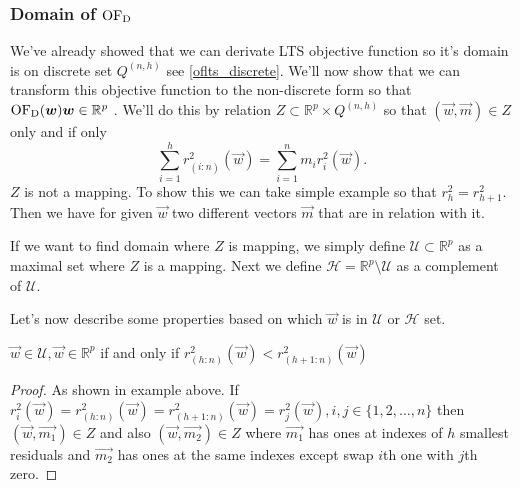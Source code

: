 \subsubsection{Domain of $\operatorname{OF_D}$}
We've already showed that we can derivate LTS objective function so it's domain is on discrete set  $Q^{(n,h)}$ see \ref{oflts_discrete}. We'll now show that we can transform this objective function to the non-discrete form so that $\operatorname{OF_D} (\boldsymbol{w}) \boldsymbol{w} \in \mathbb{R}^p$ \cite{klouda2015exact}.
We'll do this by relation $Z \subset \mathbb{R}^p \times Q^{(n,h)}$ so that $(\vec{w}, \vec{m}) \in Z$ only and if only
\begin{equation}
	\sum\limits_{i=1}^h r^{2}_{(i:n)}(\vec{w})  =  \sum\limits_{i=1}^n m_{i}r^{2}_{i}(\vec{w}).
\end{equation}
$Z$ is not a mapping. To show this we can take simple example so that $r^{2}_{h} = r^{2}_{h+1}$. Then we have for given $\vec{w}$ two different vectors $\vec{m}$ that are in relation with it.

If we want to find domain where $Z$ is mapping, we simply define $\mathcal{U} \subset \mathbb{R}^{p}$ as a maximal set where $Z$ is a mapping. Next we define 
$\mathcal{H} = \mathbb{R}^{p}  \setminus   \mathcal{U}$
as a complement of $\mathcal{U}$.

Let's now describe some properties based on which $\vec{w}$ is in $\mathcal{U}$ or $\mathcal{H}$ set.

\begin{theorem} \label{klouda1}
	$\vec{w} \in \mathcal{U}, \vec{w} \in \mathbb{R}^{p}$ if and only if 
	$r^{2}_{(h:n)}(\vec{w}) < r^{2}_{(h+1:n)}(\vec{w})$
\end{theorem}
\begin{proof}
	As shown in example above. If $r^{2}_{i}(\vec{w}) = r^{2}_{(h:n)}(\vec{w}) = r^{2}_{(h+1:n)}(\vec{w}) = r^{2}_{j}(\vec{w}), i,j \in   \{{1,2,\ldots , n\}} $ then $(\vec{w}, \vec{m_1}) \in Z$ and also $(\vec{w}, \vec{m_2}) \in Z$ where $\vec{m_1}$ has ones at indexes of $h$ smallest residuals and $\vec{m_2}$ has ones at the same indexes except swap $i$th one with $j$th zero.
\end{proof}

